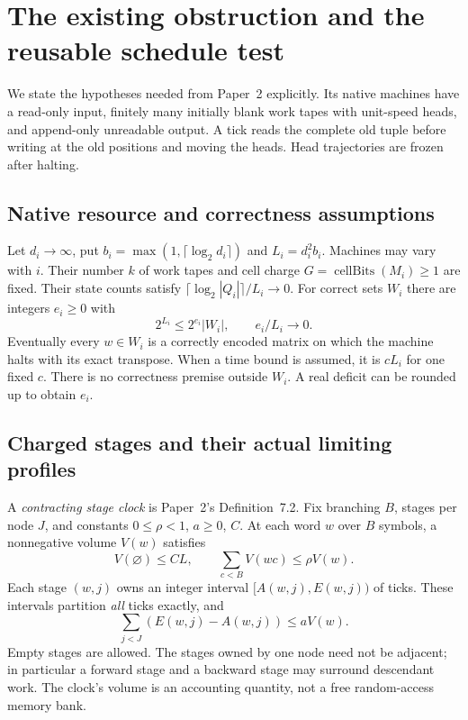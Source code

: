 \section{The existing obstruction and the reusable schedule test}
\label{sec:criterion}

We state the hypotheses needed from Paper~2 explicitly. Its native machines
have a read-only input, finitely many initially blank work tapes with
unit-speed heads, and append-only unreadable output. A tick reads the
complete old tuple before writing at the old positions and moving the
heads. Head trajectories are frozen after halting.

\subsection{Native resource and correctness assumptions}

Let $d_i\to\infty$, put
$b_i=\max(1,\lceil\log_2d_i\rceil)$ and $L_i=d_i^2b_i$.
Machines may vary with $i$. Their number $k$ of work tapes and cell charge
$G=\operatorname{cellBits}(M_i)\ge1$ are fixed. Their state counts satisfy
$\lceil\log_2|Q_i|\rceil/L_i\to0$.
For correct sets $W_i$ there are integers $e_i\ge0$ with
\begin{equation}
\label{eq:nearfull}
 2^{L_i}\le 2^{e_i}|W_i|,\qquad e_i/L_i\longrightarrow0.
\end{equation}
Eventually every $w\in W_i$ is a correctly encoded matrix on which the
machine halts with its exact transpose. When a time bound is assumed, it
is $cL_i$ for one fixed $c$. There is no correctness premise outside
$W_i$. A real deficit can be rounded up to obtain $e_i$.

\subsection{Charged stages and their actual limiting profiles}

A \emph{contracting stage clock} is Paper~2's Definition~7.2. Fix branching
$B$, stages per node $J$, and constants $0\le\rho<1$, $a\ge0$, $C$.
At each word $w$ over $B$ symbols, a nonnegative volume $V(w)$ satisfies
\[
 V(\varnothing)\le CL,\qquad \sum_{c<B}V(wc)\le\rho V(w).
\]
Each stage $(w,j)$ owns an integer interval $[A(w,j),E(w,j))$ of ticks.
These intervals partition \emph{all} ticks exactly, and
\[
 \sum_{j<J}(E(w,j)-A(w,j))\le aV(w).
\]
Empty stages are allowed. The stages owned by one node need not be
adjacent; in particular a forward stage and a backward stage may surround
descendant work. The clock's volume is an accounting quantity, not a
free random-access memory bank.

